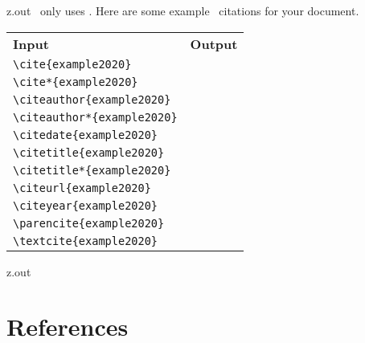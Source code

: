 \MyIO


\begin{VerbatimOut}{z.out}
\PurdueThesisLogo\ only uses \BibLaTeXLogo.
Here are some example \BibLaTeXLogo\ citations for your document.

\begin{tabular}{@{}ll@{}}
  \bf Input&                        \bf Output\\
  \verb+\cite{example2020}+&        \cite{example2020}\\
  \verb+\cite*{example2020}+&       \cite*{example2020}\\
  \verb+\citeauthor{example2020}+&  \citeauthor{example2020}\\
  \verb+\citeauthor*{example2020}+& \citeauthor*{example2020}\\
  \verb+\citedate{example2020}+&    \citedate{example2020}\\
  \verb+\citetitle{example2020}+&   \citetitle{example2020}\\
  \verb+\citetitle*{example2020}+&  \citetitle*{example2020}\\
  \verb+\citeurl{example2020}+&     \citeurl{example2020}\\
  \verb+\citeyear{example2020}+&    \citeyear{example2020}\\
  \verb+\parencite{example2020}+&   \parencite{example2020}\\
  \verb+\textcite{example2020}+&    \textcite{example2020}\\
\end{tabular}
\end{VerbatimOut}

\MyIO


\begin{VerbatimOut}{z.out}


\section{References}
\end{VerbatimOut}

\MyIO


